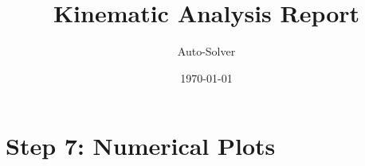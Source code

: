 \documentclass[12pt, a4paper]{article}
\title{\textbf{Kinematic Analysis Report}}
\author{Auto-Solver}
\date{\today}
\begin{document}
\maketitle
\section*{Step 7: Numerical Plots}
\end{document}

